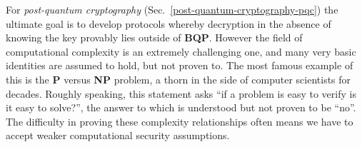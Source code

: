 For \emph{post-quantum cryptography} (Sec.~\ref{post-quantum-cryptography-pqc}) the ultimate goal is to develop protocols whereby decryption in the absence of knowing the key provably lies outside of \textbf{BQP}. However the field of computational complexity is an extremely challenging one, and many very basic identities are assumed to hold, but not proven to. The most famous example of this is the \textbf{P} versus \textbf{NP} problem, a thorn in the side of computer scientists for decades. Roughly speaking, this statement asks ``if a problem is easy to verify is it easy to solve?'', the answer to which is understood but not proven to be ``no''. The difficulty in proving these complexity relationships often means we have to accept weaker computational security assumptions.
